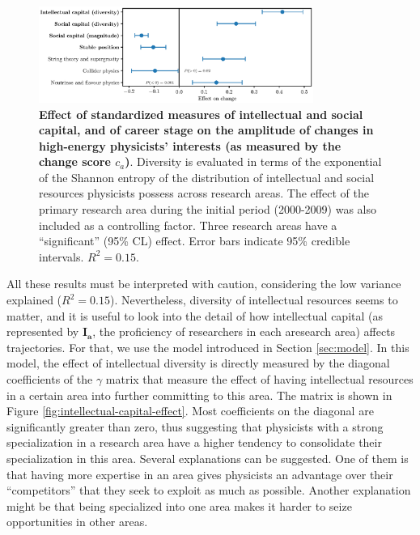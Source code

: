\documentclass{article}
\begin{document}
\begin{figure}
    \centering
    \includegraphics[width=0.8\textwidth]{plots/change_score_effects.eps}
    \caption{\textbf{Effect of standardized measures of intellectual and social capital, and of career stage on the amplitude of changes in high-energy physicists' interests (as measured by the change score $c_a$)}. Diversity is evaluated in terms of the exponential of the Shannon entropy of the distribution of intellectual and social resources physicists possess across research areas. The effect of the primary research area during the initial period (2000-2009) was also included as a controlling factor. Three research areas have a ``significant'' (95\% CL) effect. Error bars indicate 95\% credible intervals. $R^2=0.15$.}
    \label{fig:change_score_effect}
\end{figure}

All these results must be interpreted with caution, considering the low variance explained ($R^2=0.15$). Nevertheless, diversity of intellectual resources seems to matter, and it is useful to look into the detail of how intellectual capital (as represented by $\bm{I_a}$, the proficiency of researchers in each aresearch area) affects trajectories. For that, we use the model introduced in Section \ref{sec:model}. In this model, the effect of intellectual diversity is directly measured by the diagonal coefficients of the $\gamma$ matrix that measure the effect of having intellectual resources in a certain area into further committing to this area. The matrix is shown in Figure \ref{fig:intellectual-capital-effect}. Most coefficients on the diagonal are significantly greater than zero, thus suggesting that physicists with a strong specialization in a research area have a higher tendency to consolidate their specialization in this area. Several explanations can be suggested. One of them is that having more expertise in an area gives physicists an advantage over their ``competitors'' that they seek to exploit as much as possible. Another explanation might be that being specialized into one area makes it harder to seize opportunities in other areas.
\end{document}
